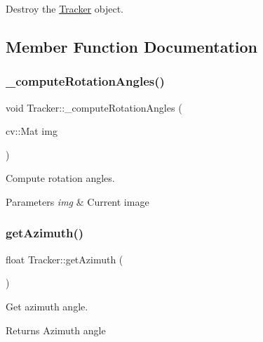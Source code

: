 Destroy the \hyperlink{class_tracker}{Tracker} object. 



\subsection{Member Function Documentation}
\mbox{\label{class_tracker_af6646cbba34dd68025f980a0c5338750}} 
\subsubsection{\texorpdfstring{\+\_\+compute\+Rotation\+Angles()}{\_computeRotationAngles()}}
{\footnotesize\ttfamily void Tracker\+::\+\_\+compute\+Rotation\+Angles (\begin{DoxyParamCaption}\item[{cv\+::\+Mat}]{img }\end{DoxyParamCaption})\hspace{0.3cm}{\ttfamily [private]}}



Compute rotation angles. 


\begin{DoxyParams}{Parameters}
{\em img} & Current image \\
\hline
\end{DoxyParams}
\mbox{\label{class_tracker_ab764ba74f2cd49081f5054b8496e73e2}} 
\subsubsection{\texorpdfstring{get\+Azimuth()}{getAzimuth()}}
{\footnotesize\ttfamily float Tracker\+::get\+Azimuth (\begin{DoxyParamCaption}{ }\end{DoxyParamCaption})}



Get azimuth angle. 

\begin{DoxyReturn}{Returns}
Azimuth angle 
\end{DoxyReturn}
\mbox{\label{class_tracker_a093248f73573ee7ebb4099954d950de9}} 
